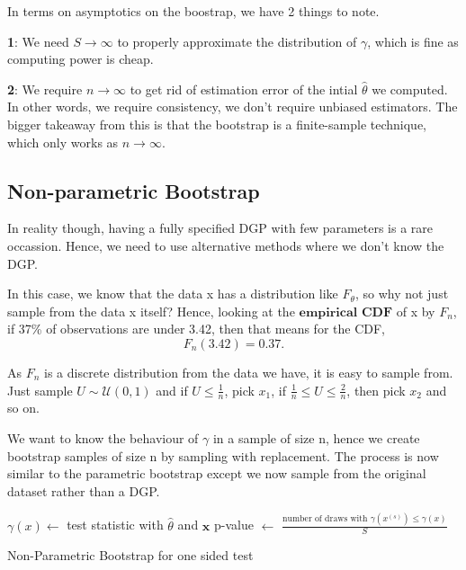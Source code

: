 \documentclass[twoside]{article}
\begin{document}
In terms on asymptotics on the boostrap, we have 2 things to note.

\textbf{1}: We need $S \rightarrow \infty$ to properly approximate the distribution of $\gamma$, which is fine as computing power is cheap. 

\textbf{2}: We require $n \rightarrow \infty$ to get rid of estimation error of the intial $\hat{\theta}$ we computed. In other words, we require consistency, we don't require unbiased estimators. The bigger takeaway from this is that the bootstrap is a finite-sample technique, which only works as $n \rightarrow \infty$.

\subsection{Non-parametric Bootstrap}

In reality though, having a fully specified DGP with few parameters is a rare occassion. Hence, we need to use alternative methods where we don't know the DGP. 

In this case, we know that the data x has a distribution like $F_{\theta}$, so why not just sample from the data x itself? Hence, looking at the $\textbf{empirical CDF}$ of x by $F_n$, if 37\% of observations are under 3.42, then that means for the CDF,
$$
F_n(3.42) = 0.37.
$$

As $F_n$ is a discrete distribution from the data we have, it is easy to sample from. Just sample $U \sim \mathcal{U}(0,1)$ and if $U \leq \frac{1}{n}$, pick $x_1$, if $\frac{1}{n} \leq U \leq \frac{2}{n}$, then pick $x_2$ and so on.

We want to know the behaviour of $\gamma$ in a sample of size n, hence we create bootstrap samples of size n by sampling with replacement. The process is now similar to the parametric bootstrap except we now sample from the original dataset rather than a DGP.
\begin{algorithm}
\DontPrintSemicolon
{}

$\gamma(x) \gets$ test statistic with $\hat{\theta}$ and $\textbf{x}$\;
p-value $\gets$ $\frac{\text{number of draws with }\gamma(x^{(s)})\leq\gamma(x)}{S}$\;


\caption{{\sc Non-Parametric Bootstrap for one sided test}}
\label{algo:duplicate}
\end{algorithm}
\end{document}
